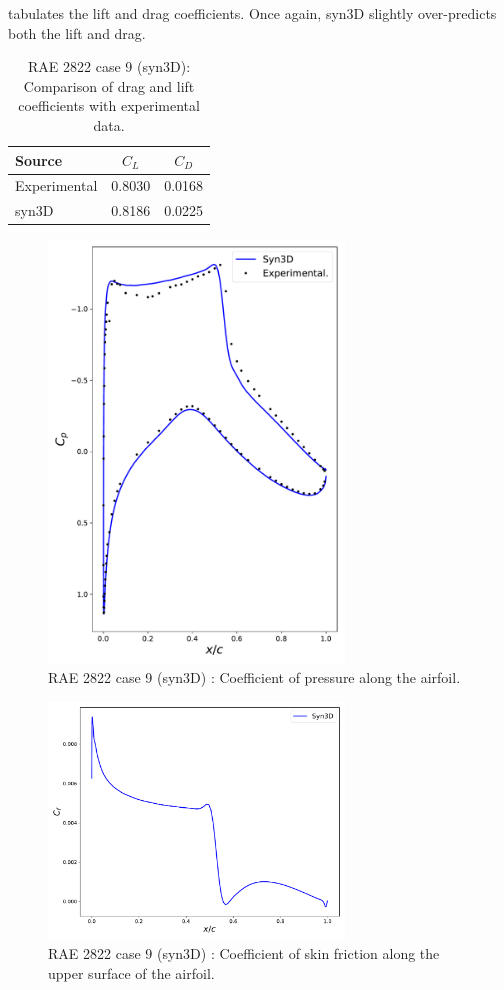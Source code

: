  tabulates the lift and drag coefficients. Once again, syn3D slightly over-predicts both the lift and drag. 
\begin{table}
    \centering
    \caption{RAE 2822 case 9 (syn3D): Comparison of drag and lift coefficients with experimental data.}
    \label{tab:raecase9}
    \begin{tabular}{@{}lcc@{}}
        \toprule
        Source & $C_L$ & $C_D$ \\
        \midrule
        Experimental & 0.8030 & 0.0168 \\
        syn3D & 0.8186 & 0.0225 \\ 
         \bottomrule
    \end{tabular}
\end{table}
\begin{figure}
    \centering
    \includegraphics[width=0.7\textwidth]{figs/rae/cp_case9}
    \caption{RAE 2822 case 9 (syn3D) : Coefficient of pressure along the airfoil.}
    \label{fig:raecp9}
\end{figure}
\begin{figure}
    \centering
    \includegraphics[width=0.7\textwidth]{figs/rae/cf_case9}
    \caption{RAE 2822 case 9 (syn3D) : Coefficient of skin friction along the upper surface of the airfoil.}
    \label{fig:raecf9}
\end{figure}